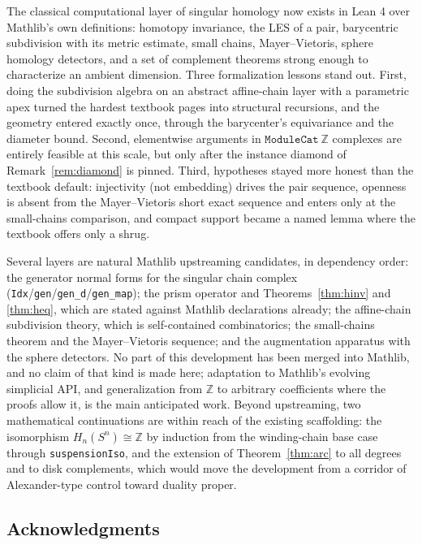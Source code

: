 \documentclass[11pt]{article}
\theoremstyle{remark}
\newcommand{\Z}{\mathbb{Z}}
\newcommand{\leanname}[1]{\texttt{#1}}
\begin{document}
The classical computational layer of singular homology now exists in Lean 4
over Mathlib's own definitions: homotopy invariance, the LES of a pair,
barycentric subdivision with its metric estimate, small chains,
Mayer--Vietoris, sphere homology detectors, and a set of complement theorems
strong enough to characterize an ambient dimension. Three formalization
lessons stand out. First, doing the subdivision algebra on an abstract
affine-chain layer with a parametric apex turned the hardest textbook pages
into structural recursions, and the geometry entered exactly once, through
the barycenter's equivariance and the diameter bound. Second, elementwise
arguments in $\leanname{ModuleCat}\ \Z$ complexes are entirely feasible at
this scale, but only after the instance diamond of
Remark~\ref{rem:diamond} is pinned. Third, hypotheses stayed more honest
than the textbook default: injectivity (not embedding) drives the pair
sequence, openness is absent from the Mayer--Vietoris short exact sequence
and enters only at the small-chains comparison, and compact support became
a named lemma where the textbook offers only a shrug.

Several layers are natural Mathlib upstreaming candidates, in dependency
order: the generator normal forms for the singular chain complex
(\leanname{Idx}/\leanname{gen}/\leanname{gen\_d}/\leanname{gen\_map}); the
prism operator and Theorems~\ref{thm:hinv} and \ref{thm:heq}, which are
stated against Mathlib declarations already; the affine-chain subdivision
theory, which is self-contained combinatorics; the small-chains theorem and
the Mayer--Vietoris sequence; and the augmentation apparatus with the sphere
detectors. No part of this development has been merged into Mathlib, and no
claim of that kind is made here; adaptation to Mathlib's evolving simplicial
API, and generalization from $\Z$ to arbitrary coefficients where the proofs
allow it, is the main anticipated work. Beyond upstreaming, two mathematical
continuations are within reach of the existing scaffolding: the isomorphism
$H_n(S^n) \cong \Z$ by induction from the winding-chain base case through
\leanname{suspensionIso}, and the extension of Theorem~\ref{thm:arc} to all
degrees and to disk complements, which would move the development from a
corridor of Alexander-type control toward duality proper.

\subsection*{Acknowledgments}
\end{document}
